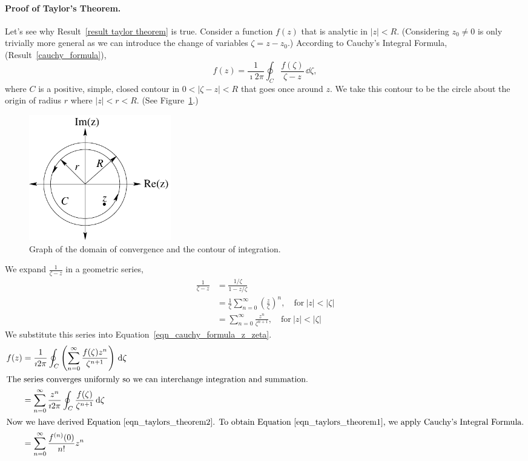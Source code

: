 \paragraph{Proof of Taylor's Theorem.}
Let's see why Result~\ref{result taylor theorem} is true.  
Consider a function $f(z)$ that is analytic
in $|z| < R$.  (Considering $z_0 \neq 0$ is only trivially more general as
we can introduce the change of variables $\zeta = z - z_0$.)  According 
to Cauchy's Integral Formula, (Result~\ref{cauchy_formula}),
\begin{equation}
  \label{eqn_cauchy_formula_z_zeta} 
  f(z) = \frac{1}{\imath 2 \pi} \oint_C \frac{f(\zeta)}{\zeta-z}\,\dd \zeta,
\end{equation}
where $C$ is a positive, simple, closed contour in $0 < |\zeta - z| < R$ that
goes once around $z$.  We take this contour to be the circle about the
origin of radius $r$ where $|z| < r < R$.
(See Figure~\ref{taylor_circles}.)



\begin{figure}[htb!]
  \begin{center}
    \includegraphics[width=0.3\textwidth]{fcv/series/taylor_circles}
    \caption{Graph of the domain of convergence and the contour 
      of integration.}
    \label{taylor_circles}
  \end{center}
\end{figure}


We expand $\frac{1}{\zeta - z}$ in a geometric series,
\begin{align*}
  \frac{1}{\zeta - z} 
  &= \frac{1/\zeta}{1 - z/\zeta} 
  \\
  &= \frac{1}{\zeta} \sum_{n = 0}^\infty \left( \frac{ z }{ \zeta } \right)^n,
  \quad \mathrm{for}\ |z| < |\zeta| 
  \\
  &= \sum_{n = 0}^\infty \frac{ z^n }{ \zeta^{n+1} }, \quad \mathrm{for}\ |z| < |\zeta|
\end{align*}
We substitute this series into Equation~\ref{eqn_cauchy_formula_z_zeta}.
\begin{align*}
  f(z)    
  &= \frac{1}{\imath 2 \pi} \oint_C \left( 
    \sum_{n = 0}^\infty \frac{ f(\zeta) z^n }{ \zeta^{n+1} } \right)\,\mathrm{d} \zeta 
  \\
  \intertext{The series converges uniformly so we can interchange 
    integration and summation.}
  &= \sum_{n = 0}^\infty \frac{z^n}{\imath 2 \pi} \oint_C \frac{ f(\zeta) }{ \zeta^{n+1} }\,\mathrm{d} \zeta \\
  \intertext{Now we have derived Equation~\ref{eqn_taylors_theorem2}.
    To obtain Equation~\ref{eqn_taylors_theorem1}, we apply Cauchy's Integral 
    Formula.}
  &= \sum_{n = 0}^\infty \frac{f^{(n)}(0)}{n!} z^n
\end{align*}


